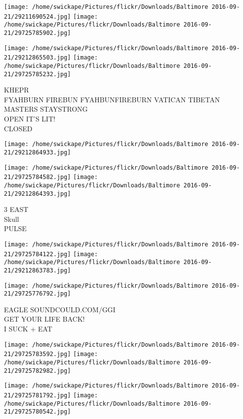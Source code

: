 \documentclass[10pt,letterpaper]{article}
\begin{document}
\texttt{[image: /home/swickape/Pictures/flickr/Downloads/Baltimore 2016-09-21/29211690524.jpg]}
\texttt{[image: /home/swickape/Pictures/flickr/Downloads/Baltimore 2016-09-21/29725785902.jpg]}

\texttt{[image: /home/swickape/Pictures/flickr/Downloads/Baltimore 2016-09-21/29212865503.jpg]}
\texttt{[image: /home/swickape/Pictures/flickr/Downloads/Baltimore 2016-09-21/29725785232.jpg]}

KHEPR\\
FYAHBURN FIREBUN FYAHBUNFIREBURN VATICAN TIBETAN MASTERS STAYSTRONG\\
OPEN IT'S LIT!\\
CLOSED\\
\pagebreak

\texttt{[image: /home/swickape/Pictures/flickr/Downloads/Baltimore 2016-09-21/29212864933.jpg]}

\vspace{0.25in}
\texttt{[image: /home/swickape/Pictures/flickr/Downloads/Baltimore 2016-09-21/29725784582.jpg]}
\texttt{[image: /home/swickape/Pictures/flickr/Downloads/Baltimore 2016-09-21/29212864393.jpg]}

3 EAST\\
Skull\\
PULSE\\
\pagebreak

\texttt{[image: /home/swickape/Pictures/flickr/Downloads/Baltimore 2016-09-21/29725784122.jpg]}
\texttt{[image: /home/swickape/Pictures/flickr/Downloads/Baltimore 2016-09-21/29212863783.jpg]}

\vspace{0.25in}
\texttt{[image: /home/swickape/Pictures/flickr/Downloads/Baltimore 2016-09-21/29725776792.jpg]}

EAGLE SOUNDCOULD.COM/GGI\\
GET YOUR LIFE BACK!\\
I SUCK + EAT\\
\pagebreak

\texttt{[image: /home/swickape/Pictures/flickr/Downloads/Baltimore 2016-09-21/29725783592.jpg]}
\texttt{[image: /home/swickape/Pictures/flickr/Downloads/Baltimore 2016-09-21/29725782982.jpg]}

\texttt{[image: /home/swickape/Pictures/flickr/Downloads/Baltimore 2016-09-21/29725781792.jpg]}
\texttt{[image: /home/swickape/Pictures/flickr/Downloads/Baltimore 2016-09-21/29725780542.jpg]}
\end{document}
